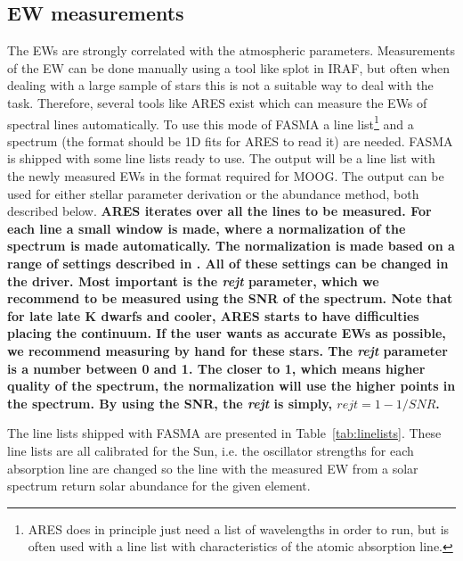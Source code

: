 \documentclass{aa}
\begin{document}
\subsection{EW measurements}
\label{sub:EW_measurements}
The EWs are strongly correlated with the atmospheric parameters. Measurements of
the EW can be done manually using a tool like splot in IRAF, but often when
dealing with a large sample of stars this is not a suitable way to deal with the
task. Therefore, several tools like ARES exist which can measure the EWs of
spectral lines automatically. To use this mode of FASMA a line
list\footnote{ARES does in principle just need a list of wavelengths in order to
run, but is often used with a line list with characteristics of the atomic
absorption line.} and a spectrum (the format should be 1D fits for ARES to read
it) are needed. FASMA is shipped with some line lists ready to use. The output
will be a line list with the newly measured EWs in the format required for MOOG.
The output can be used for either stellar parameter derivation or the abundance
method, both described below. {\bf ARES iterates over all the lines to be
measured. For each line a small window is made, where a normalization of the
spectrum is made automatically. The normalization is made based on a range of
settings described in \citet{Sousa2015a}. All of these settings can be changed
in the driver. Most important is the \emph{rejt} parameter, which we recommend
to be measured using the SNR of the spectrum. Note that for late late K dwarfs
and cooler, ARES starts to have difficulties placing the continuum. If the user
wants as accurate EWs as possible, we recommend measuring by hand for these
stars. The \emph{rejt} parameter is a number between 0 and 1. The closer to 1,
which means higher quality of the spectrum, the normalization will use the
higher points in the spectrum. By using the SNR, the \emph{rejt} is simply,
$\mathit{rejt}=1-1/SNR$.}

The line lists shipped with FASMA are presented in Table~\ref{tab:linelists}.
These line lists are all calibrated for the Sun, i.e. the oscillator strengths
for each absorption line are changed so the line with the measured EW from a
solar spectrum return solar abundance for the given element.
\end{document}
